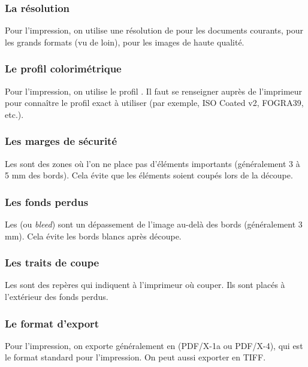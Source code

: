 \subsubsection{La résolution}

Pour l'impression, on utilise une résolution de  pour les documents courants,  pour les grands formats (vu de loin),  pour les images de haute qualité.

\subsubsection{Le profil colorimétrique}

Pour l'impression, on utilise le profil . Il faut se renseigner auprès de l'imprimeur pour connaître le profil exact à utiliser (par exemple, ISO Coated v2, FOGRA39, etc.).

\subsubsection{Les marges de sécurité}

Les  sont des zones où l'on ne place pas d'éléments importants (généralement 3 à 5 mm des bords). Cela évite que les éléments soient coupés lors de la découpe.

\subsubsection{Les fonds perdus}

Les  (ou \emph{bleed}) sont un dépassement de l'image au-delà des bords (généralement 3 mm). Cela évite les bords blancs après découpe.

\subsubsection{Les traits de coupe}

Les  sont des repères qui indiquent à l'imprimeur où couper. Ils sont placés à l'extérieur des fonds perdus.

\subsubsection{Le format d'export}

Pour l'impression, on exporte généralement en  (PDF/X-1a ou PDF/X-4), qui est le format standard pour l'impression. On peut aussi exporter en TIFF.

